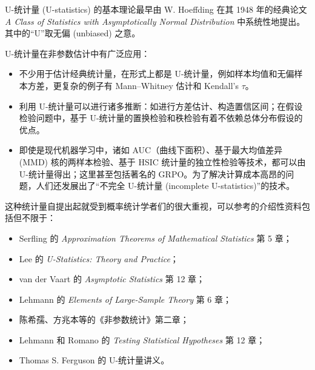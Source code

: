 
U-统计量 (U-statistics) 的基本理论最早由 W. Hoeffding 在其 1948 年的经典论文 \emph{A Class of Statistics with Asymptotically Normal Distribution} 中系统性地提出\cite{hoeffding1948}。其中的``U''取无偏 (unbiased) 之意。

U-统计量在非参数估计中有广泛应用：

\begin{itemize}
\item
  不少用于估计经典统计量，在形式上都是 U-统计量，例如样本均值和无偏样本方差，更复杂的例子有 Mann--Whitney 估计和 Kendall's $\tau$。
\item
  利用 U-统计量可以进行诸多推断：如进行方差估计、构造置信区间；在假设检验问题中，基于 U-统计量的置换检验和秩检验有着不依赖总体分布假设的优点。
\item
  即使是现代机器学习中，诸如 AUC（曲线下面积）、基于最大均值差异 (MMD) 核的两样本检验、基于 HSIC 统计量的独立性检验等技术，都可以由 U-统计量得出；这里甚至包括著名的 GRPO\cite{zhou2026grpo}。为了解决计算成本高昂的问题，人们还发展出了``不完全 U-统计量 (incomplete U-statistics)''的技术。
\end{itemize}

这种统计量自提出起就受到概率统计学者们的很大重视，可以参考的介绍性资料包括但不限于：

\begin{itemize}
\item
  Serfling 的 \emph{Approximation Theorems of Mathematical Statistics} 第 5 章\cite[Chapter~5]{serfling1980}；
\item
  Lee 的 \emph{U-Statistics: Theory and Practice}\cite{lee1990}；
\item
  van der Vaart 的 \emph{Asymptotic Statistics} 第 12 章\cite[Chapter~12]{vandervaart1998}；
\item
  Lehmann 的 \emph{Elements of Large-Sample Theory} 第 6 章\cite[Chapter~6]{lehmann1999}；
\item
  陈希孺、方兆本等的《非参数统计》第二章\cite[第 2 章]{chenxiru2012}；
\item
  Lehmann 和 Romano 的 \emph{Testing Statistical Hypotheses} 第 12 章\cite[Chapter~12]{lehmannromano2022}；
\item
  Thomas S. Ferguson 的 U-统计量讲义\cite{fergusonustat}。
\end{itemize}


